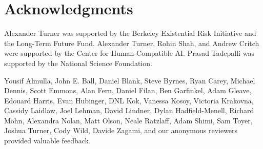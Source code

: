 \if{}
\section*{Acknowledgments}
Alexander Turner was supported by the Berkeley Existential Risk Initiative and the Long-Term Future Fund. Alexander Turner, Rohin Shah, and Andrew Critch were supported by the Center for Human-Compatible AI. Prasad Tadepalli was supported by the National Science Foundation.

Yousif Almulla, John E. Ball, Daniel Blank, Steve Byrnes, Ryan Carey, Michael Dennis, Scott Emmons, Alan Fern, Daniel Filan, Ben Garfinkel, Adam Gleave, Edouard Harris, Evan Hubinger,  DNL Kok, Vanessa Kosoy, Victoria Krakovna, Cassidy Laidlaw, Joel Lehman, David Lindner, Dylan Hadfield-Menell, Richard Möhn, Alexandra Nolan, Matt Olson, Neale Ratzlaff, Adam Shimi, Sam Toyer, Joshua Turner, Cody Wild, Davide Zagami, and our anonymous reviewers provided valuable feedback.
\fi